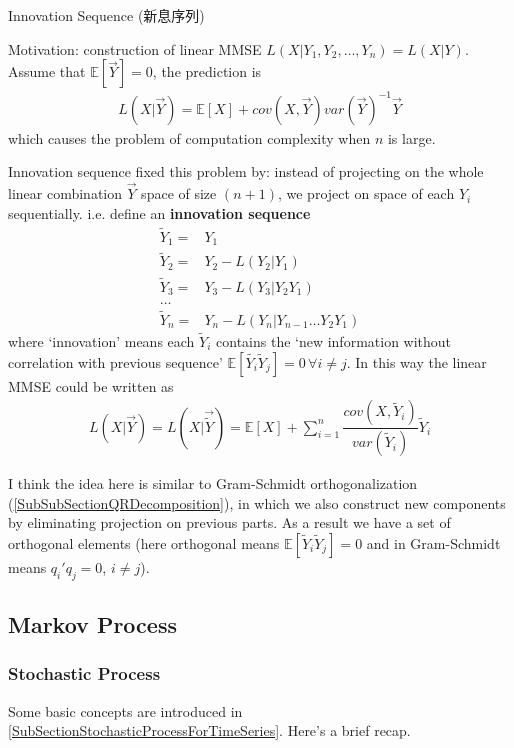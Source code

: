 \begin{point}
    Innovation Sequence (新息序列)
\end{point}

Motivation: construction of linear MMSE $ L(X|Y_1,Y_2,\ldots,Y_n)=L(X|Y) $. Assume that $\mathbb{E}\left[ \vec{Y} \right] =0 $, the prediction is
\begin{align*}
    L(X|\vec{Y})=\mathbb{E}\left[ X \right] + cov(X,\vec{Y})var(\vec{Y})^{-1}\vec{Y}
\end{align*}
which causes the problem of computation complexity when $ n $ is large. 

Innovation sequence fixed this problem by: instead of projecting on the whole linear combination $ \vec{Y} $ space of size $ (n+1) $, we project on space of each $ Y_i $ sequentially. i.e. define an \textbf{innovation sequence} 
\begin{align*}
    \tilde{Y}_1=&Y_1\\
    \tilde{Y}_2=&Y_2-L(Y_2|Y_1)\\
    \tilde{Y}_3=&Y_3-L(Y_3|Y_2Y_1)\\
    \ldots&\\
    \tilde{Y}_n=&Y_n-L(Y_n|Y_{n-1}\ldots Y_2Y_1)
\end{align*}
where `innovation' means each $ \tilde{Y}_i $ contains the `new information without correlation with previous sequence' $ \mathbb{E}\left[ \tilde{Y_i}\tilde{Y}_j \right]=0\,\forall i\neq j  $. In this way the linear MMSE could be written as
\begin{align*}
    L(X|\vec{Y})=L(X|\vec{\tilde{Y}})= \mathbb{E}\left[ X \right] +\sum_{i=1}^n \dfrac{cov(X,\tilde{Y}_i)}{var(\tilde{Y}_i)}\tilde{Y}_i
\end{align*}

I think the idea here is similar to Gram-Schmidt orthogonalization (\autoref{SubSubSectionQRDecomposition}), in which we also construct new components by eliminating projection on previous parts. As a result we have a set of orthogonal elements (here orthogonal means $ \mathbb{E}\left[ \tilde{Y}_i\tilde{Y}_j \right]=0  $ and in Gram-Schmidt means $ q_i'q_j = 0 $, $ i\neq j $).






\subsection{Markov Process}

\subsubsection{Stochastic Process}
Some basic concepts are introduced in \autoref{SubSectionStochasticProcessForTimeSeries}. Here's a brief recap.

